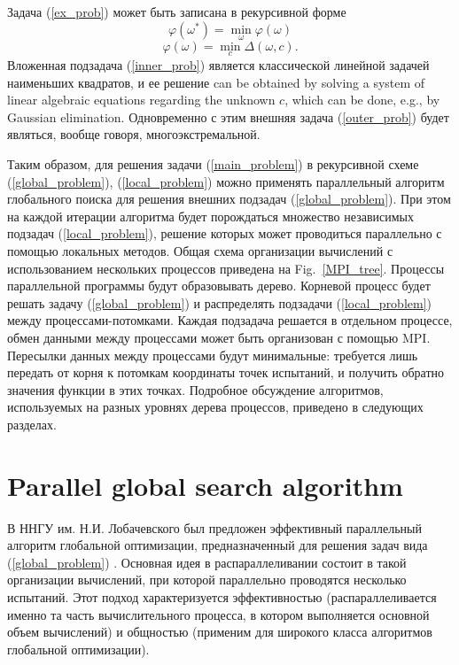 \documentclass{svproc}
\begin{document}
Задача (\ref{ex_prob}) может быть записана в рекурсивной форме
\begin{equation}\label{outer_prob}
\varphi(\omega^*) = \min_\omega \varphi(\omega)
\end{equation}
\begin{equation}\label{inner_prob}
\varphi(\omega) = \min_c \Delta(\omega,c).
\end{equation}
Вложенная подзадача (\ref{inner_prob}) является классической линейной задачей наименьших квадратов, и ее решение can be obtained by solving a system of linear algebraic equations regarding the unknown $c$, which can be done, e.g., by Gaussian elimination. Одновременно с этим внешняя задача (\ref{outer_prob}) будет являться, вообще говоря, многоэкстремальной.
 

Таким образом, для решения задачи (\ref{main_problem}) в рекурсивной схеме (\ref{global_problem}), (\ref{local_problem}) можно применять параллельный алгоритм глобального поиска для решения внешних подзадач (\ref{global_problem}). При этом на каждой итерации алгоритма будет порождаться множество независимых подзадач (\ref{local_problem}), решение которых может проводиться параллельно с помощью локальных методов.
Общая схема организации вычислений с использованием нескольких процессов приведена на Fig.~\ref{MPI_tree}. 
Процессы параллельной программы будут образовывать дерево. 
Корневой процесс будет решать задачу (\ref{global_problem}) и распределять подзадачи (\ref{local_problem}) между процессами-потомками. Каждая подзадача решается в отдельном процессе, обмен данными между процессами может быть организован с помощью MPI. Пересылки данных между процессами будут минимальные: требуется лишь передать от корня к потомкам координаты точек испытаний, и получить обратно значения функции в этих точках.
Подробное обсуждение алгоритмов, используемых на разных уровнях дерева процессов, приведено в следующих разделах.  

\section{Parallel global search algorithm}

В ННГУ им. Н.И. Лобачевского был предложен \cite{Barkalov2018,Strongin2018,globalizerSystem} эффективный параллельный алгоритм глобальной оптимизации, предназначенный для решения задач вида (\ref{global_problem}) . 
Основная идея в распараллеливании состоит в такой организации вычислений, при которой параллельно проводятся несколько испытаний. Этот подход характеризуется эффективностью (распараллеливается именно та часть вычислительного процесса, в котором выполняется основной объем вычислений) и общностью (применим для широкого класса алгоритмов глобальной оптимизации).
\end{document}
